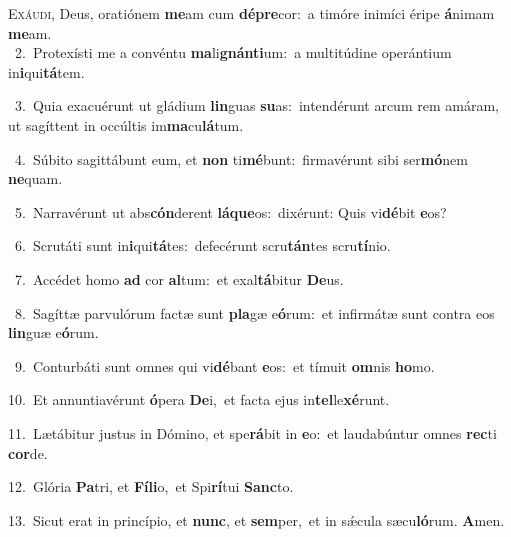 \lettrine{\initial\textcolor{\initialcolor}{E}}{xáudi,} Deus, oratiónem \textbf{me}\-am cum \textbf{dé}\-\textbf{pre}cor:~\star a timóre inimíci éripe \textbf{á}\-nimam \textbf{me}\-am.\\
{\numbfont\textcolor{\numbcolor}{~2.}}~Protexísti me a convéntu \textbf{ma}\-li\-\textbf{gnán}\-\textbf{ti}um:~\star a multitúdine operántium in\-\textbf{i}\-qui\-\textbf{tá}\-tem.\par
{\numbfont\textcolor{\numbcolor}{~3.}}~Quia exacuérunt ut gládium \textbf{lin}\-guas \textbf{su}\-as:~\star intendérunt arcum rem amáram, ut sagíttent in occúltis im\-\textbf{ma}\-cu\-\textbf{lá}\-tum.\par
{\numbfont\textcolor{\numbcolor}{~4.}}~Súbito sagittábunt eum, et \textbf{non} ti\-\textbf{mé}\-bunt:~\star firmavérunt sibi ser\-\textbf{mó}\-nem \textbf{ne}\-quam.\par
{\numbfont\textcolor{\numbcolor}{~5.}}~Narravérunt ut abs\-\textbf{cón}\-derent \textbf{lá}\-\textbf{que}os:~\star dixérunt: Quis vi\-\textbf{dé}\-bit \textbf{e}\-os?\par
{\numbfont\textcolor{\numbcolor}{~6.}}~Scrutáti sunt in\-\textbf{i}\-qui\-\textbf{tá}\-tes:~\star defecérunt scru\-\textbf{tán}\-tes scru\-\textbf{tí}\-nio.\par
{\numbfont\textcolor{\numbcolor}{~7.}}~Accédet homo \textbf{ad} cor \textbf{al}\-tum:~\star et exal\-\textbf{tá}\-bitur \textbf{De}\-us.\par
{\numbfont\textcolor{\numbcolor}{~8.}}~Sagíttæ parvulórum factæ sunt \textbf{pla}\-gæ e\-\textbf{ó}\-rum:~\star et infirmátæ sunt contra eos \textbf{lin}\-guæ e\-\textbf{ó}\-rum.\par
{\numbfont\textcolor{\numbcolor}{~9.}}~Conturbáti sunt omnes qui vi\-\textbf{dé}\-bant \textbf{e}\-os:~\star et tímuit \textbf{om}\-nis \textbf{ho}\-mo.\par
{\numbfont\textcolor{\numbcolor}{10.}}~Et annuntiavérunt \textbf{ó}\-pera \textbf{De}\-i,~\star et facta ejus in\-\textbf{tel}\-le\-\textbf{xé}\-runt.\par
{\numbfont\textcolor{\numbcolor}{11.}}~Lætábitur justus in Dómino, et spe\-\textbf{rá}\-bit in \textbf{e}\-o:~\star et laudabúntur omnes \textbf{rec}\-ti \textbf{cor}\-de.\par
{\numbfont\textcolor{\numbcolor}{12.}}~Glória \textbf{Pa}\-tri, et \textbf{Fí}\-\textbf{li}o,~\star et Spi\-\textbf{rí}\-tui \textbf{Sanc}\-to.\par
{\numbfont\textcolor{\numbcolor}{13.}}~Sicut erat in princípio, et \textbf{nunc}\-, et \textbf{sem}\-per,~\star et in sǽcula sæcu\-\textbf{ló}\-rum. \textbf{A}\-men.\par
